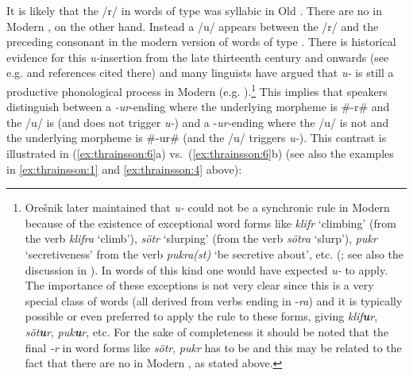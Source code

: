 \documentclass[output=paper,
modfonts
]{LSP/langsci}
\begin{document}
\noindent It is likely that the /r/ in words of type  was syllabic in Old
. There are no  in Modern , on the
other hand. Instead a /u/ appears between the /r/ and the preceding
consonant in the modern version of words of type . There is
historical evidence for this \emph{u-}insertion from the late
thirteenth century and onwards (see e.g. \citealt{kristinsson1992}
and references cited there) and many linguists have argued that
\emph{u-} is still a productive phonological process in Modern
 (e.g.  \citealt{anderson1969a,anderson1969b,oresnik1972,roegnvaldsson1981,kiparsky1984}).\footnote{Orešnik later  maintained that
  \emph{u-} could not be a synchronic rule in Modern 
  because of the existence of exceptional word forms like \emph{klifr}
  `climbing' (from the verb \emph{klifra} `climb'), \emph{sötr}
  `slurping' (from the verb \emph{sötra} `slurp'), \emph{pukr}
  `secretiveness' from the verb \emph{pukra(st)} `be secretive about',
  etc. (\citealt{oresnik1978}; see also the discussion in \citealt{kjartansson1984}). In words of this
  kind one would have expected \emph{u-} to apply. The
  importance of these exceptions is not very clear since this is a very
  special class of words (all derived from verbs ending in -\emph{ra})
  and it is typically possible or even preferred to apply the 
  rule to these forms, giving \emph{klif\textbf{u}r},
  \emph{söt\textbf{u}r}, \emph{puk\textbf{u}r}, etc. For the sake of
  completeness it should be noted that the final \emph{-r} in word forms
  like \emph{sötr}, \emph{pukr} has to be  and this may be
  related to the fact that there are no  in Modern
  , as stated above.} This implies that speakers distinguish
between a \emph{-ur}-ending where the underlying morpheme is \#-r\# and
the /u/ is  (and does not trigger \emph{u-}) and a
-\emph{ur-}ending where the /u/ is not  and the underlying
morpheme is \#-ur\# (and the /u/ triggers \emph{u-}). This
contrast is illustrated in (\ref{ex:thrainsson:6}a) vs.\ (\ref{ex:thrainsson:6}b) (see also the examples in \ref{ex:thrainsson:1}
and \ref{ex:thrainsson:4} above):
\end{document}
